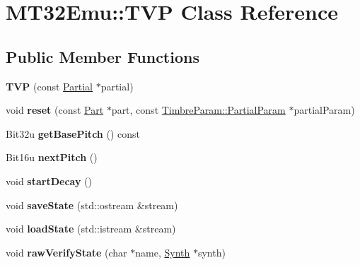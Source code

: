 \hypertarget{classMT32Emu_1_1TVP}{\section{M\-T32\-Emu\-:\-:T\-V\-P Class Reference}
\label{classMT32Emu_1_1TVP}
}
\subsection*{Public Member Functions}
\begin{DoxyCompactItemize}
\item 
\hypertarget{classMT32Emu_1_1TVP_a4dfe9bc8fc331b50c393bdadb9e9694c}{{\bfseries T\-V\-P} (const \hyperlink{classMT32Emu_1_1Partial}{Partial} $\ast$partial)}\label{classMT32Emu_1_1TVP_a4dfe9bc8fc331b50c393bdadb9e9694c}

\item 
\hypertarget{classMT32Emu_1_1TVP_acf6d3eda26992a171644fbb75f9385c4}{void {\bfseries reset} (const \hyperlink{classMT32Emu_1_1Part}{Part} $\ast$part, const \hyperlink{structMT32Emu_1_1TimbreParam_1_1PartialParam}{Timbre\-Param\-::\-Partial\-Param} $\ast$partial\-Param)}\label{classMT32Emu_1_1TVP_acf6d3eda26992a171644fbb75f9385c4}

\item 
\hypertarget{classMT32Emu_1_1TVP_af349ddf87e05b471ad973a7c47413607}{Bit32u {\bfseries get\-Base\-Pitch} () const }\label{classMT32Emu_1_1TVP_af349ddf87e05b471ad973a7c47413607}

\item 
\hypertarget{classMT32Emu_1_1TVP_a312b2971f2fb7ee753df1866fa332594}{Bit16u {\bfseries next\-Pitch} ()}\label{classMT32Emu_1_1TVP_a312b2971f2fb7ee753df1866fa332594}

\item 
\hypertarget{classMT32Emu_1_1TVP_a6dc67707b7ce67f2bb14cf7b4ee3479d}{void {\bfseries start\-Decay} ()}\label{classMT32Emu_1_1TVP_a6dc67707b7ce67f2bb14cf7b4ee3479d}

\item 
\hypertarget{classMT32Emu_1_1TVP_a7389cd7a8146ac51c1c245e76bdcb57c}{void {\bfseries save\-State} (std\-::ostream \&stream)}\label{classMT32Emu_1_1TVP_a7389cd7a8146ac51c1c245e76bdcb57c}

\item 
\hypertarget{classMT32Emu_1_1TVP_add92fd27670377df57ac6793f597ec59}{void {\bfseries load\-State} (std\-::istream \&stream)}\label{classMT32Emu_1_1TVP_add92fd27670377df57ac6793f597ec59}

\item 
\hypertarget{classMT32Emu_1_1TVP_a3e2fd3c6c8aacaa51334cab01de49d9a}{void {\bfseries raw\-Verify\-State} (char $\ast$name, \hyperlink{classMT32Emu_1_1Synth}{Synth} $\ast$synth)}\label{classMT32Emu_1_1TVP_a3e2fd3c6c8aacaa51334cab01de49d9a}

\end{DoxyCompactItemize}


